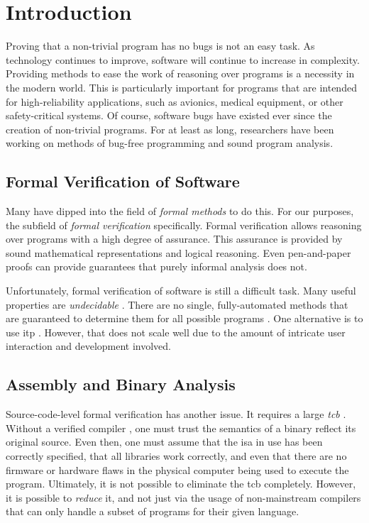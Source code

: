 \chapter{Introduction}\label{introduction}
Proving that a non-trivial program has no bugs is not an easy task.
As technology continues to improve, software will continue to increase in complexity.
Providing methods to ease the work of reasoning over programs is a necessity in the modern world.
This is particularly important for programs that are intended for high-reliability applications,
such as avionics, medical equipment, or other safety-critical systems.
Of course, software bugs have existed ever since the creation of non-trivial programs.
For at least as long, researchers have been working on methods of bug-free programming and sound program analysis.

\section{Formal Verification of Software}
Many have dipped into the field of \emph{formal methods} \autocite{butler:fm} to do this.
For our purposes, the subfield of \emph{formal verification} specifically.
Formal verification allows reasoning over programs with a high degree of assurance.
This assurance is provided by sound mathematical representations and logical reasoning.
Even pen-and-paper proofs can provide guarantees that purely informal analysis does not.

Unfortunately, formal verification of software is still a difficult task.
Many useful properties are \emph{undecidable} \autocite{rice1953classes,horspool1980approach,ouimet2008formal}.
There are no single, fully-automated methods that are guaranteed to determine them for all possible programs \autocite{bonacina2010theoremproving}.
One alternative is to use \ac{itp} \autocite{harrison2014itp,maric2015itp,schopf2018itp}.
However, that does not scale well due to the amount of intricate user interaction and development involved.

\section{Assembly and Binary Analysis}\label{intro-analysis}
Source-code-level formal verification has another issue.
It requires a large \emph{\ac{tcb}}
\autocites[270]{lampson1992authentication}{orange-book}[13]{rushby1981dvss}.
Without a verified compiler \autocite{leroy:compcert}, one must trust the semantics of a binary reflect its original source.
Even then, one must assume that the \ac{isa} in use has been correctly specified, that all libraries work correctly, and even that there are no firmware or hardware flaws in the physical computer being used to execute the program.
Ultimately, it is not possible to eliminate the \ac{tcb} completely.
However, it is possible to \emph{reduce} it, and not just via the usage of non-mainstream compilers that can only handle a subset of programs for their given language.

